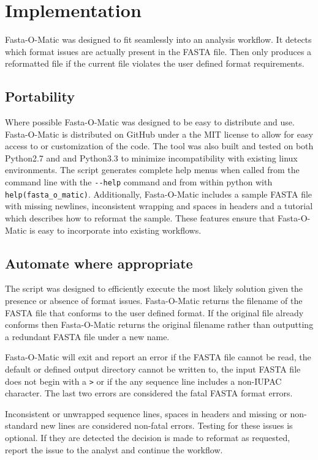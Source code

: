 \section{Implementation}

Fasta-O-Matic was designed to fit seamlessly into an analysis workflow. It detects which format issues are actually present in the FASTA file. Then only produces a reformatted file if the current file violates the user defined format requirements. 


\subsection{Portability}

Where possible Fasta-O-Matic was designed to be easy to distribute and use. Fasta-O-Matic is distributed on GitHub under a the MIT license to allow for easy access to or customization of the code. The tool was also built and tested on both Python2.7 and and Python3.3 to minimize incompatibility with existing linux environments. The script generates complete help menus when called from the command line with the \verb|--help| command and from within python with \verb|help(fasta_o_matic)|. Additionally, Fasta-O-Matic includes a sample FASTA file with missing newlines, inconsistent wrapping and spaces in headers and a tutorial which describes how to reformat the sample. These features ensure that Fasta-O-Matic is easy to incorporate into existing workflows.

\subsection{Automate where appropriate} 

The script was designed to efficiently execute the most likely solution given the presence or absence of format issues. Fasta-O-Matic returns the filename of the FASTA file that conforms to the user defined format. If the original file already conforms then Fasta-O-Matic returns the original filename rather than outputting a redundant FASTA file under a new name.

Fasta-O-Matic will exit and report an error if the FASTA file cannot be read, the default or defined output directory cannot be written to, the input FASTA file does not begin with a \verb|>| or if the any sequence line includes a non-IUPAC character. The last two errors are considered the fatal FASTA format errors.

Inconsistent or unwrapped sequence lines, spaces in headers and missing or non-standard new lines are considered non-fatal errors. Testing for these issues is optional. If they are detected the decision is made to reformat as requested, report the issue to the analyst and continue the workflow.

